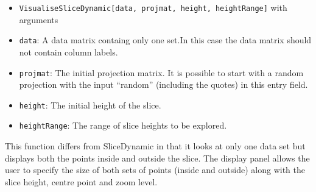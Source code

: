 \documentclass[]{interact}
\theoremstyle{plain}%
\theoremstyle{definition}
\theoremstyle{remark}
\begin{document}
\begin{itemize}
\item
  \texttt{VisualiseSliceDynamic{[}data,\ projmat,\ height,\ heightRange{]}}
  with arguments
\item
  \texttt{data}: A data matrix containg only one set.In this case the
  data matrix should not contain column labels.
\item
  \texttt{projmat}: The initial projection matrix. It is possible to
  start with a random projection with the input ``random'' (including
  the quotes) in this entry field.
\item
  \texttt{height}: The initial height of the slice.
\item
  \texttt{heightRange}: The range of slice heights to be explored.
\end{itemize}

This function differs from SliceDynamic in that it looks at only one
data set but displays both the points inside and outside the slice. The
display panel allows the user to specify the size of both sets of points
(inside and outside) along with the slice height, centre point and zoom
level.



\end{document}
